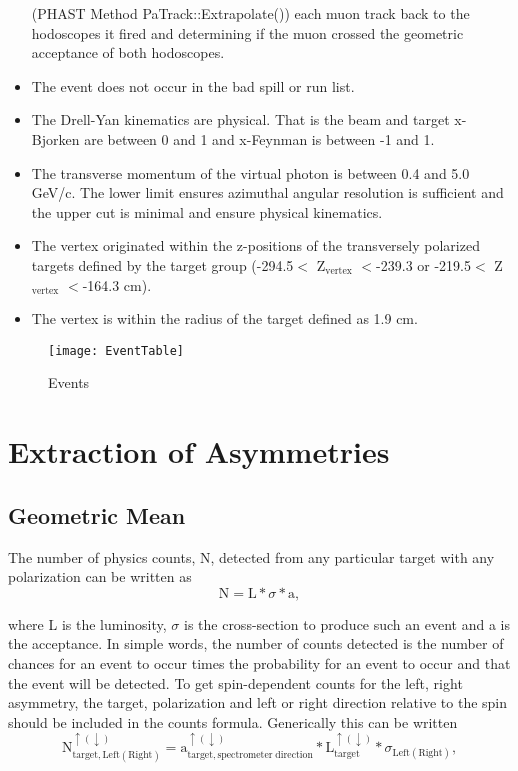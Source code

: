 \begin{itemize}
  (PHAST Method PaTrack::Extrapolate()) each muon track back to the hodoscopes
  it fired and determining if the muon crossed the geometric acceptance of both
  hodoscopes.
\item The event does not occur in the bad spill or run list.
\item The Drell-Yan kinematics are physical.  That is the beam and target
  x-Bjorken are between 0 and 1 and x-Feynman is between -1 and 1.
\item The transverse momentum of the virtual photon is between 0.4 and 5.0
  GeV/c.  The lower limit ensures azimuthal angular resolution is sufficient and
  the upper cut is minimal and ensure physical kinematics.
\item The vertex originated within the z-positions of the transversely polarized
  targets defined by the target group (-294.5$<$ Z$_{\mathrm{vertex}}$ $<$-239.3
  or -219.5$<$ Z$_{\mathrm{vertex}}$ $<$-164.3 cm).
\item The vertex is within the radius of the target defined as 1.9 cm.
\end{itemize}

\begin{figure}
  \begin{center}
    \texttt{[image: EventTable]}
    \caption{Events}
    \label{fig::EventTable}%
  \end{center}
\end{figure}

\section{Extraction of Asymmetries} 

\subsection{Geometric Mean}
The number of physics counts, N, detected from any particular target with any
polarization can be written as
\begin{equation}
\mathrm{N} = \mathrm{L} * \sigma * \mathrm{a},
\end{equation}

\noindent
where L is the luminosity, $\sigma$ is the cross-section to produce such an
event and a is the acceptance.  In simple words, the number of counts detected
is the number of chances for an event to occur times the probability for an
event to occur and that the event will be detected.  To get spin-dependent
counts for the left, right asymmetry, the target, polarization and left or right
direction relative to the spin should be included in the counts formula.
Generically this can be written
\begin{equation}
  \label{eqn:indexedCount}
\mathrm{N}^{\uparrow(\downarrow)}_{\mathrm{target},\mathrm{Left(Right)}} =
\mathrm{a}^{\uparrow(\downarrow)}_{\mathrm{target},\mathrm{spectrometer \;
    direction}} * \mathrm{L}^{\uparrow(\downarrow)}_{\mathrm{target}} *
\sigma_{\mathrm{Left(Right)}},
\end{equation}

